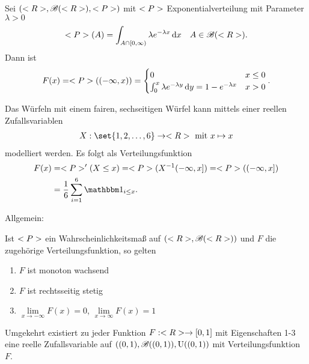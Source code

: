 
\begin{example}
	Sei $(<R>, \mathscr{B}(<R>),<P>)$ mit $<P>$ Exponentialverteilung mit Parameter $\lambda > 0$
	\begin{align}
		<P>(A) = \int_{A \cap [0,\infty)}\lambda e^{-\lambda x} \,\mathrm{d} x \quad A \in \mathscr{B}(<R>).\notag
	\end{align}
	Dann ist
	\begin{align}
		F(x) = <P>((-\infty, x)) = \begin{cases}
		0 &x \le 0\\
		\int_{0}^{x} \lambda e^{-\lambda y} \,\mathrm{d} y = 1 - e^{-\lambda x} &x > 0
		\end{cases}.\notag
	\end{align}
\end{example}

\begin{center}
	
\end{center}

\begin{example}
	Das Würfeln mit einem fairen, sechseitigen Würfel kann mittels einer reellen Zufallsvariablen
	\begin{align}
		X: \set{1,2,\dots, 6} \to \R \mit x \mapsto x\notag
	\end{align}
	modelliert werden. Es folgt als Verteilungsfunktion
	\begin{align}
		F(x) &= \probp'(X \le x) = \probp(X^{-1}(-\infty,x]) = \probp((-\infty,x])\notag\\
		&= \frac{1}{6}\sum_{i=1}^{6} \indi_{i \le x}.\notag
	\end{align}
\end{example}

\begin{center}
	
\end{center}

Allgemein:

\begin{proposition}
	Ist $<P>$ ein Wahrscheinlichkeitsmaß auf $(<R>, \mathscr{B}(<R>))$ und $F$ die zugehörige Verteilungsfunktion, so gelten
	\begin{enumerate}
		\item $F$ ist monoton wachsend
		\item $F$ ist rechtsseitig stetig
		\item $\lim\limits_{x\to -\infty} F(x) = 0$, $\lim\limits_{x\to \infty} F(x) = 1$
	\end{enumerate}
	Umgekehrt existiert zu jeder Funktion $F: <R> \to [0,1]$ mit Eigenschaften 1-3 eine reelle Zufallsvariable auf $((0,1), \mathscr{B}((0,1)), \operatorname{U}((0,1))$ mit Verteilungsfunktion $F$.
\end{proposition}

